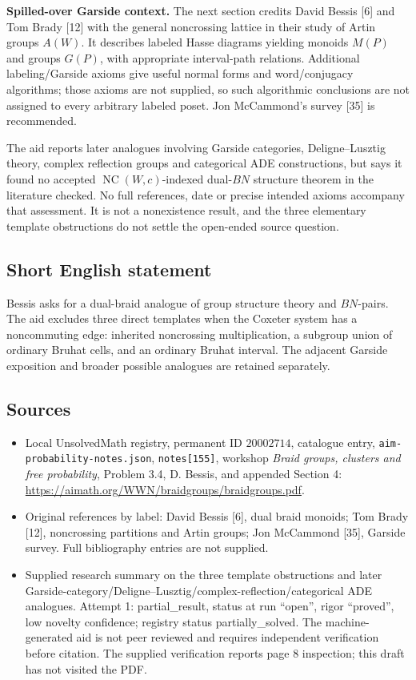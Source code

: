 \documentclass[11pt]{article}
\begin{document}
\textbf{Spilled-over Garside context.} The next section credits David Bessis [6] and Tom Brady [12] with the general noncrossing lattice in their study of Artin groups \(A(W)\). It describes labeled Hasse diagrams yielding monoids \(M(P)\) and groups \(G(P)\), with appropriate interval-path relations. Additional labeling/Garside axioms give useful normal forms and word/conjugacy algorithms; those axioms are not supplied, so such algorithmic conclusions are not assigned to every arbitrary labeled poset. Jon McCammond's survey [35] is recommended.

The aid reports later analogues involving Garside categories, Deligne--Lusztig theory, complex reflection groups and categorical ADE constructions, but says it found no accepted \(\operatorname{NC}(W,c)\)-indexed dual-\(BN\) structure theorem in the literature checked. No full references, date or precise intended axioms accompany that assessment. It is not a nonexistence result, and the three elementary template obstructions do not settle the open-ended source question.
\subsection{Short English statement}
Bessis asks for a dual-braid analogue of group structure theory and \(BN\)-pairs. The aid excludes three direct templates when the Coxeter system has a noncommuting edge: inherited noncrossing multiplication, a subgroup union of ordinary Bruhat cells, and an ordinary Bruhat interval. The adjacent Garside exposition and broader possible analogues are retained separately.
\subsection{Sources}
\begin{itemize}
\item Local UnsolvedMath registry, permanent ID \(20002714\), catalogue entry, \texttt{aim-probability-notes.json}, \texttt{notes[155]}, workshop \emph{Braid groups, clusters and free probability}, Problem 3.4, D. Bessis, and appended Section 4: \url{https://aimath.org/WWN/braidgroups/braidgroups.pdf}.
\item Original references by label: David Bessis [6], dual braid monoids; Tom Brady [12], noncrossing partitions and Artin groups; Jon McCammond [35], Garside survey. Full bibliography entries are not supplied.
\item Supplied research summary on the three template obstructions and later Garside-category/Deligne--Lusztig/complex-reflection/categorical ADE analogues. Attempt 1: partial\_result, status at run ``open'', rigor ``proved'', low novelty confidence; registry status partially\_solved. The machine-generated aid is not peer reviewed and requires independent verification before citation. The supplied verification reports page 8 inspection; this draft has not visited the PDF.
\end{itemize}
\end{document}
